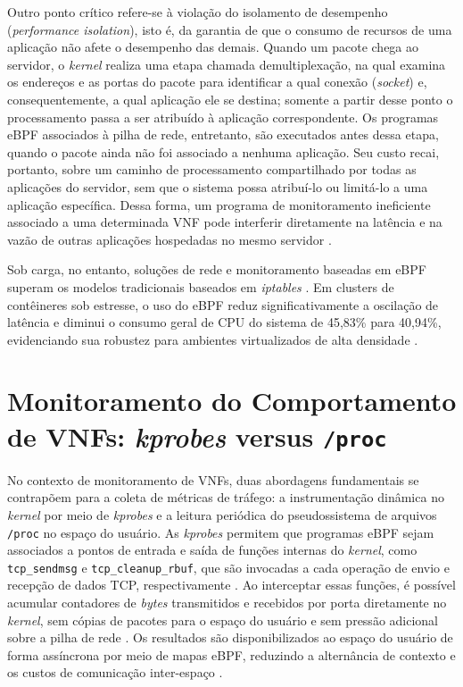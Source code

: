 Outro ponto crítico refere-se à violação do isolamento de desempenho (\textit{performance isolation}), isto é, da garantia de que o consumo de recursos de uma aplicação não afete o desempenho das demais. Quando um pacote chega ao servidor, o \textit{kernel} realiza uma etapa chamada demultiplexação, na qual examina os endereços e as portas do pacote para identificar a qual conexão (\textit{socket}) e, consequentemente, a qual aplicação ele se destina; somente a partir desse ponto o processamento passa a ser atribuído à aplicação correspondente. Os programas eBPF associados à pilha de rede, entretanto, são executados antes dessa etapa, quando o pacote ainda não foi associado a nenhuma aplicação. Seu custo recai, portanto, sobre um caminho de processamento compartilhado por todas as aplicações do servidor, sem que o sistema possa atribuí-lo ou limitá-lo a uma aplicação específica. Dessa forma, um programa de monitoramento ineficiente associado a uma determinada VNF pode interferir diretamente na latência e na vazão de outras aplicações hospedadas no mesmo servidor \cite{shahinfar2025demystifying}.

Sob carga, no entanto, soluções de rede e monitoramento baseadas em eBPF superam os modelos tradicionais baseados em \textit{iptables} \cite{mizinski2025impact}. Em clusters de contêineres sob estresse, o uso do eBPF reduz significativamente a oscilação de latência e diminui o consumo geral de CPU do sistema de 45,83\% para 40,94\%, evidenciando sua robustez para ambientes virtualizados de alta densidade \cite{mizinski2025impact}.

\section{Monitoramento do Comportamento de VNFs: \textit{kprobes} versus \texttt{/proc}}
\label{sec:kprobes_proc}

No contexto de monitoramento de VNFs, duas abordagens fundamentais se contrapõem para a coleta de métricas de tráfego: a instrumentação dinâmica no \textit{kernel} por meio de \textit{kprobes} e a leitura periódica do pseudossistema de arquivos \texttt{/proc} no espaço do usuário. As \textit{kprobes} permitem que programas eBPF sejam associados a pontos de entrada e saída de funções internas do \textit{kernel}, como \texttt{tcp\_sendmsg} e \texttt{tcp\_cleanup\_rbuf}, que são invocadas a cada operação de envio e recepção de dados TCP, respectivamente \cite{gregg_bpf_2019}. Ao interceptar essas funções, é possível acumular contadores de \textit{bytes} transmitidos e recebidos por porta diretamente no \textit{kernel}, sem cópias de pacotes para o espaço do usuário e sem pressão adicional sobre a pilha de rede \cite{10.1109/NOMS47738.2020.9110434}. Os resultados são disponibilizados ao espaço do usuário de forma assíncrona por meio de mapas eBPF, reduzindo a alternância de contexto e os custos de comunicação inter-espaço \cite{gregg_bpf_2019}.

